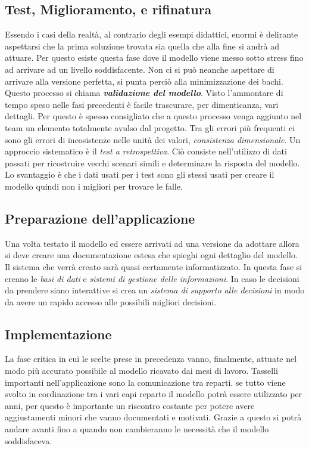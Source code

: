 \documentclass{article}
\begin{document}
    \subsection{Test, Miglioramento, e rifinatura}
      Essendo i casi della realtà, al contrario degli esempi didattici, enormi è delirante aspettarsi che la prima soluzione trovata sia quella che alla fine si andrà ad attuare. Per questo esiste questa fase dove il modello viene messo sotto stress fino ad arrivare ad un livello soddisfacente. Non ci si può neanche aspettare di arrivare alla versione perfetta, si punta perciò alla minimizzazione dei bachi. Questo processo si chiama \textbf{\textit{validazione del modello}}. Visto l'ammontare di tempo speso nelle fasi precedenti è facile trascurare, per dimenticanza, vari dettagli. Per questo è spesso consigliato che a questo processo venga aggiunto nel team un elemento totalmente avulso dal progetto. Tra gli errori più frequenti ci sono gli errori di incosistenze nelle unità dei valori, \textit{consistenza dimensionale}. Un approccio sistematico è il \textit{test a retrospettiva}. Ciò consiste nell'utilizzo di dati passati per ricostruire vecchi scenari simili e determinare la risposta del modello. Lo svantaggio è che i dati usati per i test sono gli stessi usati per creare il modello quindi non i migliori per trovare le falle.
      
    \subsection{Preparazione dell'applicazione}
      Una volta testato il modello ed essere arrivati ad una versione da adottare allora si deve creare una documentazione estesa che spieghi ogni dettaglio del modello. Il sistema che verrà creato sarà quasi certamente informatizzato. In questa fase si creano le \textit{basi di dati} e \textit{sistemi di gestione delle informazioni}. In caso le decisioni da prendere siano interattive si crea un \textit{sistema di supporto alle decisioni} in modo da avere un rapido accesso alle possibili migliori decisioni. 

    \subsection{Implementazione}
      La fase critica in cui le scelte prese in precedenza vanno, finalmente, attuate nel modo più accurato possibile al modello ricavato dai mesi di lavoro. Tasselli importanti nell'applicazione sono la comunicazione tra reparti. se tutto viene svolto in cordinazione tra i vari capi reparto il modello potrà essere utilizzato per anni, per questo è importante un riscontro costante per potere avere aggiustamenti minori che vanno documentati e motivati. Grazie a questo si potrà andare avanti fino a quando non cambieranno le necessità che il modello soddisfaceva.
\end{document}
